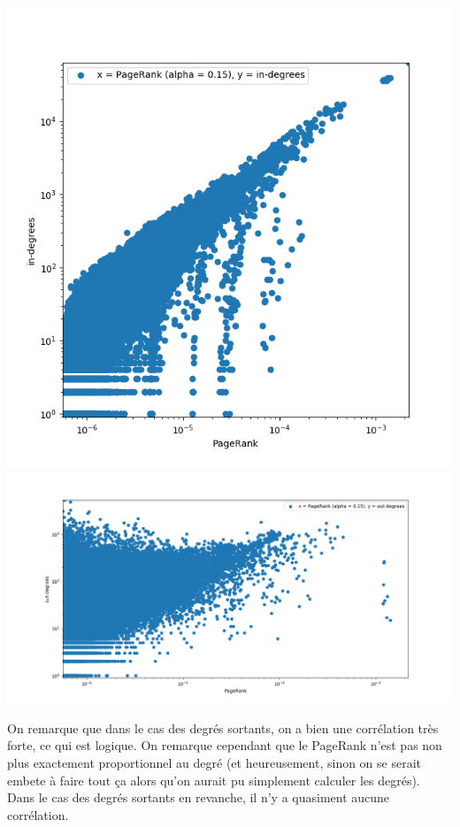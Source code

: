 \documentclass{report}
\begin{document}
\begin{center}
  \includegraphics[width=0.25\paperwidth]{assets/pagerankindegs.png}
  \includegraphics[width=0.25\paperwidth]{assets/pagerankoutdegs.png}
\end{center}

On remarque que dans le cas des degrés sortants, on a bien une corrélation très forte, ce qui est logique. On remarque cependant que le PageRank n'est pas non plus exactement proportionnel au degré (et heureusement, sinon on se serait embete à faire tout ça alors qu'on aurait pu simplement calculer les degrés).\\
Dans le cas des degrés sortants en revanche, il n'y a quasiment aucune corrélation.
\end{document}
